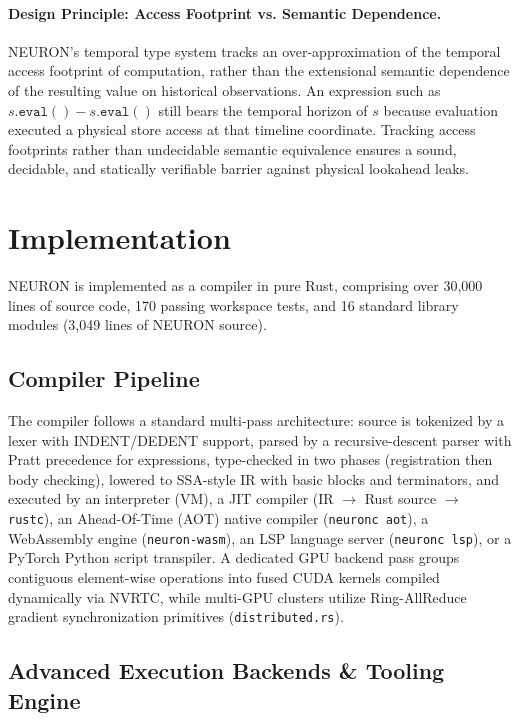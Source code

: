 \documentclass[11pt,a4paper]{article}
\newcommand{\ty}[1]{\texttt{#1}}
\begin{document}
\paragraph{Design Principle: Access Footprint vs. Semantic Dependence.}
NEURON's temporal type system tracks an over-approximation of the temporal access footprint of computation, rather than the extensional semantic dependence of the resulting value on historical observations. An expression such as $s.\ty{eval}() - s.\ty{eval}()$ still bears the temporal horizon of $s$ because evaluation executed a physical store access at that timeline coordinate. Tracking access footprints rather than undecidable semantic equivalence ensures a sound, decidable, and statically verifiable barrier against physical lookahead leaks.


\section{Implementation}

NEURON is implemented as a compiler in pure Rust, comprising over 30,000 lines of source code, 170 passing workspace tests, and 16 standard library modules (3,049 lines of NEURON source).

\subsection{Compiler Pipeline}

The compiler follows a standard multi-pass architecture: source is tokenized by a lexer with INDENT/DEDENT support, parsed by a recursive-descent parser with Pratt precedence for expressions, type-checked in two phases (registration then body checking), lowered to SSA-style IR with basic blocks and terminators, and executed by an interpreter (VM), a JIT compiler (IR $\to$ Rust source $\to$ \texttt{rustc}), an Ahead-Of-Time (AOT) native compiler (\texttt{neuronc aot}), a WebAssembly engine (\texttt{neuron-wasm}), an LSP language server (\texttt{neuronc lsp}), or a PyTorch Python script transpiler. A dedicated GPU backend pass groups contiguous element-wise operations into fused CUDA kernels compiled dynamically via NVRTC, while multi-GPU clusters utilize Ring-AllReduce gradient synchronization primitives (\texttt{distributed.rs}).

\subsection{Advanced Execution Backends \& Tooling Engine}
\end{document}
